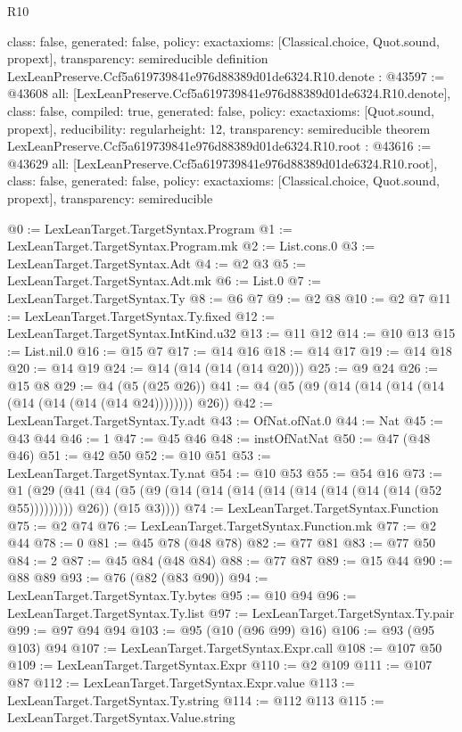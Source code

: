 \begin{lexlean}{R10}
\begin{coremodule}
{  class: false,
  generated: false,
  policy: exact{axioms: [Classical.choice, Quot.sound, propext]},
  transparency: semireducible
}
definition LexLeanPreserve.Ccf5a619739841e976d88389d01de6324.R10.denote : @43597 := @43608 {
  all: [LexLeanPreserve.Ccf5a619739841e976d88389d01de6324.R10.denote],
  class: false,
  compiled: true,
  generated: false,
  policy: exact{axioms: [Quot.sound, propext]},
  reducibility: regular{height: 12},
  transparency: semireducible
}
theorem LexLeanPreserve.Ccf5a619739841e976d88389d01de6324.R10.root : @43616 := @43629 {
  all: [LexLeanPreserve.Ccf5a619739841e976d88389d01de6324.R10.root],
  class: false,
  generated: false,
  policy: exact{axioms: [Classical.choice, Quot.sound, propext]},
  transparency: semireducible
}

@0 := LexLeanTarget.TargetSyntax.Program
@1 := LexLeanTarget.TargetSyntax.Program.mk
@2 := List.cons.{0}
@3 := LexLeanTarget.TargetSyntax.Adt
@4 := @2 @3
@5 := LexLeanTarget.TargetSyntax.Adt.mk
@6 := List.{0}
@7 := LexLeanTarget.TargetSyntax.Ty
@8 := @6 @7
@9 := @2 @8
@10 := @2 @7
@11 := LexLeanTarget.TargetSyntax.Ty.fixed
@12 := LexLeanTarget.TargetSyntax.IntKind.u32
@13 := @11 @12
@14 := @10 @13
@15 := List.nil.{0}
@16 := @15 @7
@17 := @14 @16
@18 := @14 @17
@19 := @14 @18
@20 := @14 @19
@24 := @14 (@14 (@14 (@14 @20)))
@25 := @9 @24
@26 := @15 @8
@29 := @4 (@5 (@25 @26))
@41 := @4 (@5 (@9 (@14 (@14 (@14 (@14 (@14 (@14 (@14 (@14 @24)))))))) @26))
@42 := LexLeanTarget.TargetSyntax.Ty.adt
@43 := OfNat.ofNat.{0}
@44 := Nat
@45 := @43 @44
@46 := 1
@47 := @45 @46
@48 := instOfNatNat
@50 := @47 (@48 @46)
@51 := @42 @50
@52 := @10 @51
@53 := LexLeanTarget.TargetSyntax.Ty.nat
@54 := @10 @53
@55 := @54 @16
@73 := @1
    (@29
      (@41 (@4 (@5 (@9 (@14 (@14 (@14 (@14 (@14 (@14 (@14 (@14 (@52 @55))))))))) @26)) (@15 @3))))
@74 := LexLeanTarget.TargetSyntax.Function
@75 := @2 @74
@76 := LexLeanTarget.TargetSyntax.Function.mk
@77 := @2 @44
@78 := 0
@81 := @45 @78 (@48 @78)
@82 := @77 @81
@83 := @77 @50
@84 := 2
@87 := @45 @84 (@48 @84)
@88 := @77 @87
@89 := @15 @44
@90 := @88 @89
@93 := @76 (@82 (@83 @90))
@94 := LexLeanTarget.TargetSyntax.Ty.bytes
@95 := @10 @94
@96 := LexLeanTarget.TargetSyntax.Ty.list
@97 := LexLeanTarget.TargetSyntax.Ty.pair
@99 := @97 @94 @94
@103 := @95 (@10 (@96 @99) @16)
@106 := @93 (@95 @103) @94
@107 := LexLeanTarget.TargetSyntax.Expr.call
@108 := @107 @50
@109 := LexLeanTarget.TargetSyntax.Expr
@110 := @2 @109
@111 := @107 @87
@112 := LexLeanTarget.TargetSyntax.Expr.value
@113 := LexLeanTarget.TargetSyntax.Ty.string
@114 := @112 @113
@115 := LexLeanTarget.TargetSyntax.Value.string

\end{coremodule}
\end{lexlean}
